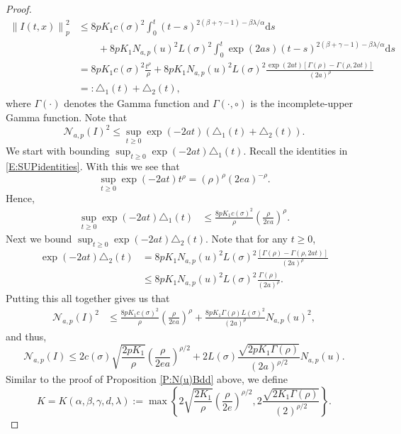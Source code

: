 \documentclass[a4paper,11pt]{article}
\numberwithin{equation}{section}
\theoremstyle{plain}
\theoremstyle{definition}
\newcommand{\ud}{\ensuremath{\mathrm{d} }}
\newcommand{\Norm}[1]{\left\|  #1   \right\|}
\numberwithin{NQ}{section}
\numberwithin{LQ}{section}
\numberwithin{ZQ}{section}
\begin{document}
\begin{proof}
\begin{align*}
		\Norm{I(t,x)}_p^2 & \le  8p K_1 c(\sigma)^2 \int_0^t (t-s)^{2(\beta + \gamma -1)-\beta \lambda /\alpha} \ud s \\
		&\qquad + 8p K_1 N_{a,p}(u)^2 L(\sigma)^2\int_0^t \exp(2as) (t-s)^{2(\beta + \gamma -1)-\beta \lambda /\alpha} \ud s \\
		&= 8p K_1 c(\sigma)^2\frac{ t ^ \rho}{\rho} + 8p K_1 N_{a,p}(u)^2 L(\sigma)^2 \frac{\exp(2at) \left[ \Gamma(\rho) - \Gamma(\rho, 2at)\right]}{(2a)^{\rho} }  \\
		& =: \triangle_1(t) + \triangle_2(t),
		\end{align*}
		where $\Gamma(\cdot)$ denotes the Gamma function and $\Gamma(\cdot ,\circ)$ is the incomplete-upper Gamma function. Note that 
		\[
		\mathcal{N}_{a,p}(I)^2 \le \sup_{t \ge 0} \exp(-2at)\left( \triangle_1(t) + \triangle_2(t) \right).
		\]
		We start with bounding $\sup_{t \ge 0} \exp(-2at)\triangle_1(t)$. Recall the identities in \eqref{E:SUPidentities}. With this we see that 
		\[
		\sup_{t \ge 0} \exp(-2at) t^{\rho} = (\rho)^{\rho} (2ea)^{-\rho}.
		\]
		Hence, 
		\begin{align*}
		\sup_{t \ge 0} \exp(-2at)\triangle_1(t) & \le \frac{8p K_1 c(\sigma)^2}{\rho} \left(\frac{\rho}{2ea}\right)^{\rho}.
		\end{align*}
		Next we bound $\sup_{t \ge 0} \exp(-2at)\triangle_2(t)$. Note that for any $t\ge 0$,
		\begin{align*}
		\exp(-2at)\triangle_2(t) &= 8p K_1 N_{a,p}(u)^2 L(\sigma)^2 \frac{\left[ \Gamma(\rho) - \Gamma(\rho, 2at) \right]}{(2a)^\rho} \\
		& \le  8p K_1 N_{a,p}(u)^2 L(\sigma)^2 \frac{\Gamma(\rho)}{(2a)^{\rho}}.
		\end{align*}
		Putting this all together gives us that 
		\begin{align*}
		\mathcal{N}_{a,p}(I)^2 &\le \frac{8p K_1 c(\sigma)^2}{\rho} \left(\frac{\rho}{2ea}\right)^{\rho}  + \frac{8p K_1 \Gamma(\rho) L(\sigma)^2}{ (2a)^{\rho}}N_{a,p}(u)^2,
		\end{align*}
		and thus,
		\begin{equation*}
		\mathcal{N}_{a,p}(I)\le	2c(\sigma)\sqrt{\frac{2p K_1}{\rho}} \left(\frac{\rho}{2ea}\right)^{\rho/2}  + 2L(\sigma)\frac{\sqrt{2p K_1 \Gamma(\rho) }}{ (2a)^{\rho/2}}N_{a,p}(u).
		\end{equation*}
		Similar to the proof of Proposition \ref{P:N(u)Bdd} above, we define 
		\[
		K = K(\alpha,\beta,\gamma,d, \lambda):= \max \left\{2\sqrt{\frac{2 K_1}{\rho}} \left(\frac{\rho}{2e}\right)^{\rho/2},   2\frac{\sqrt{2 K_1 \Gamma(\rho) }}{ (2)^{\rho/2}} \right\}.
\]
\end{proof}
\end{document}
